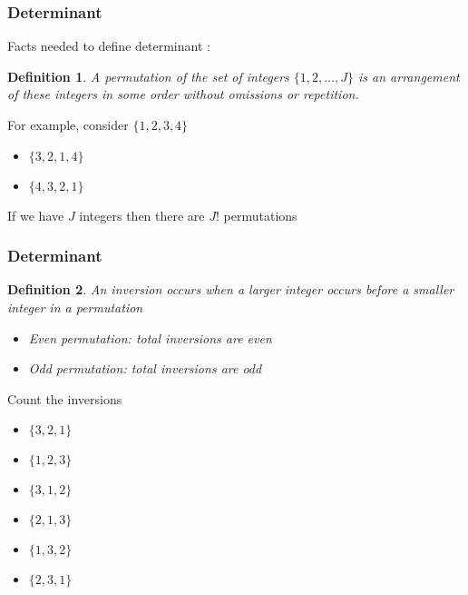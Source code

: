 \documentclass{beamer}
\newtheorem{defn}{Definition}
\numberwithin{equation}{section}
\begin{document}
\begin{frame}
\frametitle{Determinant} 

Facts needed to define determinant :

\begin{defn}
 A \alert{permutation} of the set of integers $\{1, 2, \hdots, J \}$ is an arrangement of these integers in some order without omissions or repetition.
\end{defn}

For example, consider $\{1, 2, 3, 4\}$
\begin{itemize}
\item[] $\{3, 2, 1 , 4 \}$
\item[] $\{4, 3, 2, 1 \} $
\end{itemize}

If we have $J$ integers then there are $J!$ permutations


\end{frame}


\begin{frame}
\frametitle{Determinant}

\begin{defn}
An \alert{inversion} occurs when a larger integer occurs before a smaller integer in a permutation
\begin{itemize}
\item[] Even permutation: total inversions are even
\item[] Odd permutation: total inversions are odd
\end{itemize}
\end{defn}


Count the inversions
\begin{itemize}
\item[] $\{3, 2, 1\}$
\item[] $\{1, 2, 3\}$
\item[] $\{3, 1, 2\}$
\item[] $\{2, 1, 3\}$
\item[] $\{1, 3, 2\}$
\item[] $\{2, 3, 1\}$
\end{itemize}


\end{frame}
\end{document}

